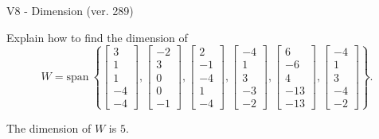 \begin{exercise}
  \begin{exerciseTitle}V8 - Dimension (ver. 289)\end{exerciseTitle}
  \begin{exerciseStatement}
    Explain how to find the dimension of 
\[W=\mathrm{span}\ \left\{\left[\begin{array}{r}
3 \\
1 \\
1 \\
-4 \\
-4
\end{array}\right] , \left[\begin{array}{r}
-2 \\
3 \\
0 \\
0 \\
-1
\end{array}\right] , \left[\begin{array}{r}
2 \\
-1 \\
-4 \\
1 \\
-4
\end{array}\right] , \left[\begin{array}{r}
-4 \\
1 \\
3 \\
-3 \\
-2
\end{array}\right] , \left[\begin{array}{r}
6 \\
-6 \\
4 \\
-13 \\
-13
\end{array}\right] , \left[\begin{array}{r}
-4 \\
1 \\
3 \\
-4 \\
-2
\end{array}\right]\right\}.\]



  \end{exerciseStatement}
  \begin{exerciseAnswer}
   The dimension of \(W\) is  \(5\).
  


  \end{exerciseAnswer}
\end{exercise}